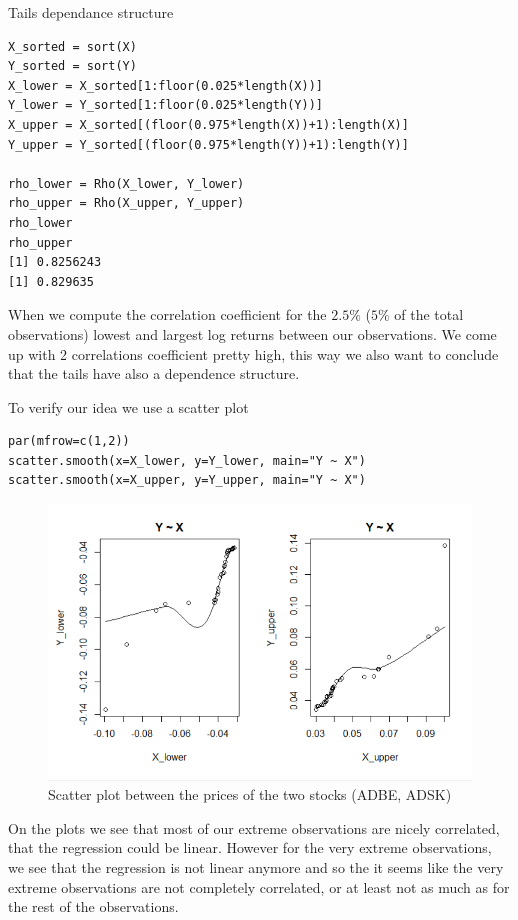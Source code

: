 \documentclass[11pt]{article}
\begin{document}
Tails dependance structure
\begin{lstlisting}
X_sorted = sort(X)
Y_sorted = sort(Y)
X_lower = X_sorted[1:floor(0.025*length(X))]
Y_lower = Y_sorted[1:floor(0.025*length(Y))]
X_upper = X_sorted[(floor(0.975*length(X))+1):length(X)]
Y_upper = Y_sorted[(floor(0.975*length(Y))+1):length(Y)]

rho_lower = Rho(X_lower, Y_lower)
rho_upper = Rho(X_upper, Y_upper)
rho_lower
rho_upper
[1] 0.8256243
[1] 0.829635
\end{lstlisting}
When we compute the correlation coefficient for the $2.5\%$ ($5\%$ of the total observations) lowest and largest log returns between our observations.
We come up with 2 correlations coefficient pretty high, this way we also want to conclude that the tails have also a dependence structure.


To verify our idea we use a scatter plot
\begin{lstlisting}
par(mfrow=c(1,2))
scatter.smooth(x=X_lower, y=Y_lower, main="Y ~ X")
scatter.smooth(x=X_upper, y=Y_upper, main="Y ~ X")
\end{lstlisting}
\begin{figure}[!ht]
 \center
  \includegraphics[width=\linewidth]{img/scatter_plot3.PNG}
  \caption{Scatter plot between the  prices of the two stocks (ADBE, ADSK)}
  \label{fig:plot data}
\end{figure}
On the plots we see that most of our extreme observations are nicely correlated, that the regression could be linear. 
However for the very extreme observations, we see that the regression is not linear anymore and so the it seems like the very extreme observations are not completely correlated, or at least not as much as for the rest of the observations.
\end{document}
